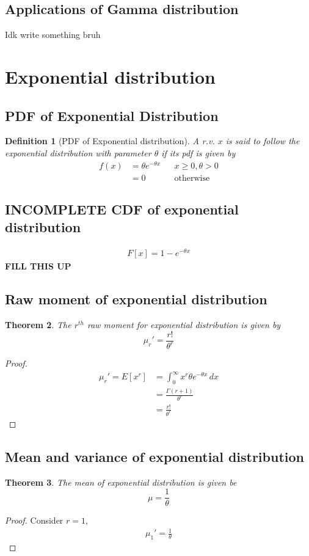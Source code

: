 \documentclass[oneside,11pt,pdftex]{book}%
\numberwithin{equation}{section}
\newtheorem{theorem}{Theorem}[chapter]%
\newtheorem{definition}[theorem]{Definition}
\numberwithin{section}{chapter}
\numberwithin{equation}{chapter}
\begin{document}
\subsection{Applications of Gamma distribution}
Idk write something bruh

\section{Exponential distribution}
\subsection{PDF of Exponential Distribution}
\begin{definition}[PDF of Exponential distribution]
	A r.v. $ x $ is said to follow the exponential distribution with parameter $ \theta  $ if its pdf is given by 
	\begin{align*}
		f(x)&= \theta e^{-\theta x} && x\geq 0, \theta > 0\\
		&= 0 && \text{otherwise}
	\end{align*}
\end{definition}


\subsection{INCOMPLETE CDF of exponential distribution}
\begin{align*}
	F[x]=1-e^{-\theta x}
\end{align*}
\textbf{FILL THIS UP}
\subsection{Raw moment of exponential distribution}

\begin{theorem}
	The $ r^{th} $ raw moment for exponential distribution is given by \[ \mu_r'=\frac{r!}{\theta^r} \]
\end{theorem}
\begin{proof}
	\begin{align*}
		\mu_r'=E[x^r]&=\int_0^\infty x^r \theta e^{-\theta x}\, dx\\
		&=\frac{\Gamma(r+1)}{\theta^r}\\
		&= \frac{r!}{\theta^r}
	\end{align*}
\end{proof}

\subsection{Mean and variance of exponential distribution}
\begin{theorem}
	The mean of exponential distribution is given be \[ \mu=\frac{1}{\theta} \]
\end{theorem}
\begin{proof}
	Consider $ r=1 $,
	\begin{align*}
		\mu_1'=\frac{1}{\theta}
	\end{align*}
\end{proof}
\end{document}
